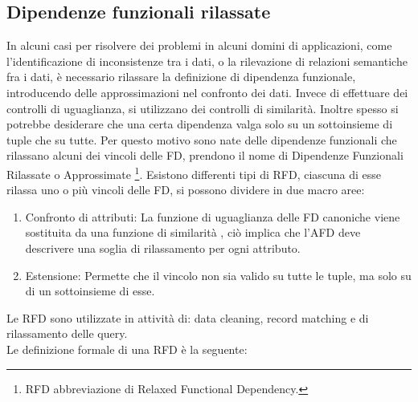 \subsection{Dipendenze funzionali rilassate}
In alcuni casi per risolvere dei problemi in alcuni domini di applicazioni, come l’identificazione di inconsistenze tra i dati, o la rilevazione di relazioni semantiche fra i dati,  è necessario rilassare la definizione di dipendenza funzionale, introducendo delle approssimazioni nel confronto dei dati. Invece di effettuare dei controlli di uguaglianza, si utilizzano dei controlli di similarità.
Inoltre spesso si potrebbe desiderare che una certa dipendenza valga solo su un sottoinsieme di tuple che su tutte.
Per questo motivo sono nate delle dipendenze funzionali che rilassano alcuni dei vincoli delle FD, prendono il nome di Dipendenze Funzionali Rilassate o Approssimate \footnote{RFD abbreviazione di Relaxed Functional Dependency.}.
Esistono differenti tipi di RFD, ciascuna di esse rilassa uno o più vincoli delle FD, si possono dividere in due macro aree:
\begin{enumerate}
	\item Confronto di attributi: La funzione di uguaglianza delle FD canoniche viene sostituita da una funzione di similarità , ciò implica che l'AFD deve descrivere una soglia di rilassamento per ogni attributo.
	\item Estensione: Permette che il vincolo non sia valido su tutte le tuple, ma solo su di un sottoinsieme di esse.
\end{enumerate}
Le RFD sono utilizzate in attività di: data cleaning, record matching e di rilassamento delle query.\\
Le definizione formale di una RFD è la seguente:
